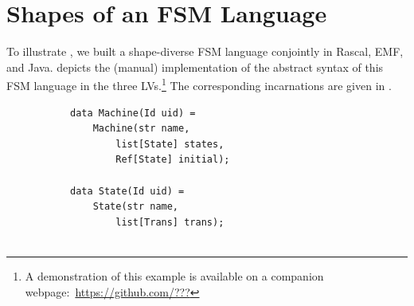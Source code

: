\section{Shapes of an FSM Language}
\label{sec:eval}

To illustrate \prism, we built a shape-diverse FSM language conjointly in Rascal, EMF, and Java.
 depicts the (manual) implementation of the abstract syntax of this FSM language in the three LVs.\footnote{A demonstration of this example is available on a companion webpage:~\url{https://github.com/???}}
The corresponding incarnations are given in .

\begin{figure}[bt]
	\centering
	\begin{subfigure}[b]{.3\columnwidth}
		\begin{lstlisting}[label=lst:fsm-adt, language=Rascal, numbers=none, xleftmargin=0pt, tabsize=1]
data Machine(Id uid) =
	Machine(str name,
		list[State] states,
		Ref[State] initial);

data State(Id uid) =
	State(str name,
		list[Trans] trans);


\end{lstlisting}
\end{subfigure}
\end{figure}
